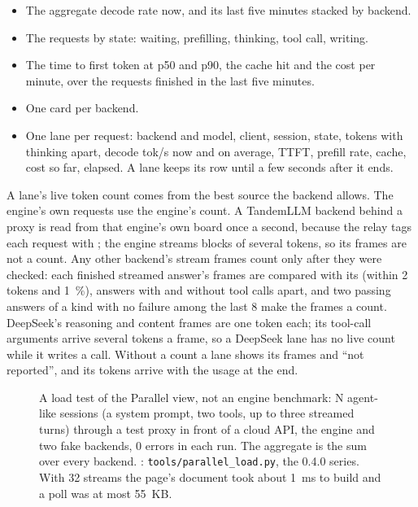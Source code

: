 \begin{itemize}
\item The aggregate decode rate now, and its last five minutes stacked by backend.
\item The requests by state: waiting, prefilling, thinking, tool call, writing.
\item The time to first token at p50 and p90, the cache hit and the cost per minute, over the requests finished in the last five minutes.
\item One card per backend.
\item One lane per request: backend and model, client, session, state, tokens with thinking apart, decode tok/s now and on average, TTFT, prefill rate, cache, cost so far, elapsed. A lane keeps its row until a few seconds after it ends.
\end{itemize}

A lane's live token count comes from the best source the backend allows. The engine's own requests use the engine's count. A TandemLLM backend behind a proxy is read from that engine's own board once a second, because the relay tags each request with ; the engine streams blocks of several tokens, so its frames are not a count. Any other backend's stream frames count only after they were checked: each finished streamed answer's frames are compared with its  (within 2 tokens and 1~\%), answers with and without tool calls apart, and two passing answers of a kind with no failure among the last 8 make the frames a count. DeepSeek's reasoning and content frames are one token each; its tool-call arguments arrive several tokens a frame, so a DeepSeek lane has no live count while it writes a call. Without a count a lane shows its frames and \enquote{not reported}, and its tokens arrive with the usage at the end.

\begin{figure}[htbp]
\centering
{}
\caption[A load test of the Parallel view]{A load test of the Parallel view, not an engine benchmark: N agent-like sessions (a system prompt, two tools, up to three streamed turns) through a test proxy in front of a cloud API, the engine and two fake backends, 0 errors in each run. The aggregate is the sum over every backend. \measured: \texttt{tools/parallel\_load.py}, the 0.4.0 series. With 32 streams the page's document took about 1~ms to build and a poll was at most 55~KB.}\label{fig:parallel}
\end{figure}

